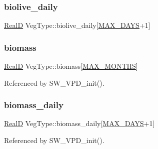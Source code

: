 \mbox{\label{struct_veg_type_a46c4bcc0a97c701c1593ad6cbd4a0472}} 
\subsubsection{\texorpdfstring{biolive\+\_\+daily}{biolive\_daily}}
{\footnotesize\ttfamily \hyperlink{generic_8h_af1c105fd5732f70b91ddaeda0cc340e3}{RealD} Veg\+Type\+::biolive\+\_\+daily\mbox{[}\hyperlink{_times_8h_a01f08d46080872b9f4284873b7f9dee4}{M\+A\+X\+\_\+\+D\+A\+YS}+1\mbox{]}}

\mbox{\label{struct_veg_type_a48191a4cc8787965340dce0e05af21e7}} 
\subsubsection{\texorpdfstring{biomass}{biomass}}
{\footnotesize\ttfamily \hyperlink{generic_8h_af1c105fd5732f70b91ddaeda0cc340e3}{RealD} Veg\+Type\+::biomass\mbox{[}\hyperlink{_times_8h_a9c97e6841188b672e984a4eba7479277}{M\+A\+X\+\_\+\+M\+O\+N\+T\+HS}\mbox{]}}



Referenced by S\+W\+\_\+\+V\+P\+D\+\_\+init().

\mbox{\label{struct_veg_type_aec9201d5b43b152d86a0450b757d0f97}} 
\subsubsection{\texorpdfstring{biomass\+\_\+daily}{biomass\_daily}}
{\footnotesize\ttfamily \hyperlink{generic_8h_af1c105fd5732f70b91ddaeda0cc340e3}{RealD} Veg\+Type\+::biomass\+\_\+daily\mbox{[}\hyperlink{_times_8h_a01f08d46080872b9f4284873b7f9dee4}{M\+A\+X\+\_\+\+D\+A\+YS}+1\mbox{]}}



Referenced by S\+W\+\_\+\+V\+P\+D\+\_\+init().

\mbox{\label{struct_veg_type_a386cea6b73513d17ac0b87354922fd08}} 

